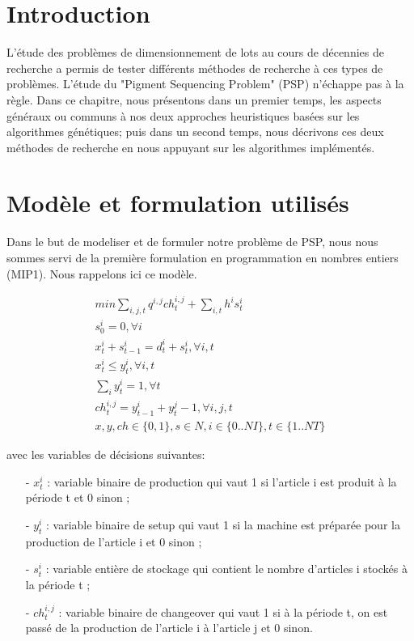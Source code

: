 \documentclass[12pt,a4paper]{article}
\begin{document}
	\section*{Introduction}
	L'étude des problèmes de dimensionnement de lots au cours de décennies de recherche a permis de tester différents méthodes de recherche à ces types de problèmes. L'étude du "Pigment Sequencing Problem" (PSP) n'échappe pas à la règle. Dans ce chapitre, nous présentons dans un premier temps, les aspects généraux ou communs à nos deux approches heuristiques basées sur les algorithmes génétiques; puis dans un second temps, nous décrivons ces deux méthodes de recherche en nous appuyant sur les algorithmes implémentés.
	
	\section{Modèle et formulation utilisés}
	Dans le but de modeliser et de formuler notre problème de PSP, nous nous sommes servi de la première formulation en programmation en nombres entiers (MIP1). Nous rappelons ici ce modèle. 
	
	\begin{eqnarray}
		min \sum_{i,j,t} q^{i,j}ch_{t}^{i,j} + \sum_{i,t} h^{i} s_{t}^{i} \\
		s_{0}^{i} = 0, \forall i \\
		x_{t}^{i} + s_{t-1}^{i} = d_{t}^{i} + s_{t}^{i}, \forall i,t \\
		x_{t}^{i} \leq y_{t}^{i}, \forall i,t \\
		\sum_{i} y_{t}^{i} = 1 , \forall t \\
		ch_{t}^{i,j} = y_{t-1}^{i} + y_{t}^{j} - 1, \forall i,j,t \\
		x,y,ch \in \{0,1\}, s \in N, i \in \{0..NI\}, t \in \{1..NT\}
	\end{eqnarray}
		
		avec les variables de décisions suivantes: \\
		\begin{itemize}
			\item[-] $x_{t}^{i}$ : variable binaire de production qui vaut 1 si l’article i est produit à la période t et 0 sinon ;
			\item[-] $y_{t}^{i}$ : variable binaire de setup qui vaut 1 si la machine est préparée pour la production de l’article i et 0 sinon ;
			\item[-] $s_{t}^{i}$ : variable entière de stockage qui contient le nombre d’articles i stockés à la période t ; 
			\item[-] $ch_{t}^{i,j}$ : variable binaire de changeover qui vaut 1 si à la période t, on est passé de la production de l’article i à l’article j et 0 sinon.
		\end{itemize}
	
\end{document}

